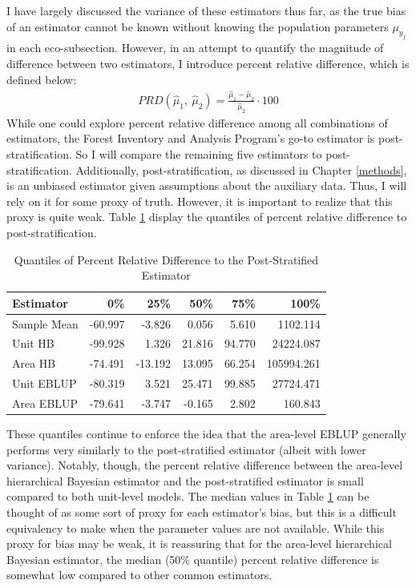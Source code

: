 \documentclass[12pt,twoside]{reedthesis}
\begin{document}
I have largely discussed the variance of these estimators thus far, as the true bias of an estimator cannot be known without knowing the population parameters \(\mu_{y_j}\) in each eco-subsection. However, in an attempt to quantify the magnitude of difference between two estimators, I introduce percent relative difference, which is defined below:
\begin{align*}
PRD(\hat\mu_1,~ \hat\mu_2) = \frac{\hat \mu_1 - \hat\mu_2}{\hat\mu_2} \cdot 100
\end{align*}
While one could explore percent relative difference among all combinations of estimators, the Forest Inventory and Analysis Program's go-to estimator is post-stratification. So I will compare the remaining five estimators to post-stratification. Additionally, post-stratification, as discussed in Chapter \ref{methods}, is an unbiased estimator given assumptions about the auxiliary data. Thus, I will rely on it for some proxy of truth. However, it is important to realize that this proxy is quite weak. Table \ref{tab:prd-tab} display the quantiles of percent relative difference to post-stratification.
\begin{longtable}[t]{lrrrrr}
\caption{\label{tab:prd-tab}Quantiles of Percent Relative Difference to the Post-Stratified Estimator}\\
\toprule
Estimator & 0\% & 25\% & 50\% & 75\% & 100\%\\
\midrule
Sample Mean & -60.997 & -3.826 & 0.056 & 5.610 & 1102.114\\
Unit HB & -99.928 & 1.326 & 21.816 & 94.770 & 24224.087\\
Area HB & -74.491 & -13.192 & 13.095 & 66.254 & 105994.261\\
Unit EBLUP & -80.319 & 3.521 & 25.471 & 99.885 & 27724.471\\
Area EBLUP & -79.641 & -3.747 & -0.165 & 2.802 & 160.843\\
\bottomrule
\end{longtable}
These quantiles continue to enforce the idea that the area-level EBLUP generally performs very similarly to the post-stratified estimator (albeit with lower variance). Notably, though, the percent relative difference between the area-level hierarchical Bayesian estimator and the post-stratified estimator is small compared to both unit-level models. The median values in Table \ref{tab:prd-tab} can be thought of as some sort of proxy for each estimator's bias, but this is a difficult equivalency to make when the parameter values are not available. While this proxy for bias may be weak, it is reassuring that for the area-level hierarchical Bayesian estimator, the median (50\% quantile) percent relative difference is somewhat low compared to other common estimators.
\end{document}
